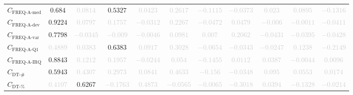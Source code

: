 \documentclass{standalone}
\newcommand{\actfreqmedianname}{\text{FREQ-A-med}}
\newcommand{\actfreqmedian}{C_{\actfreqmedianname}}
\newcommand{\actfreqdevname}{\text{FREQ-A-dev}}
\newcommand{\actfreqdev}{C_{\actfreqdevname}}
\newcommand{\actfreqvarname}{\text{FREQ-A-var}}
\newcommand{\actfreqvar}{C_{\actfreqvarname}}
\newcommand{\actfreqqonename}{\text{FREQ-A-Q1}}
\newcommand{\actfreqqone}{C_{\actfreqqonename}}
\newcommand{\actfreqiqrname}{\text{FREQ-A-IRQ}}
\newcommand{\actfreqiqr}{C_{\actfreqiqrname}}
\newcommand{\numberuniquetracesname}{\text{DT-\#}}
\newcommand{\numberuniquetraces}{C_{\numberuniquetracesname}}
\newcommand{\percentageuniquetracesname}{\text{DT-\%}}
\newcommand{\percentageuniquetraces}{C_{\percentageuniquetracesname}}
\begin{document}
\begin{tabular}{lcccccccccc}
$\actfreqmedian$ & $0.684$ & \textcolor{lightgray}{$0.0814$} & $0.5327$ & \textcolor{lightgray}{$0.0423$} & \textcolor{lightgray}{$0.2617$} & \textcolor{lightgray}{$-0.1115$} & \textcolor{lightgray}{$-0.0373$} & \textcolor{lightgray}{$0.023$} & \textcolor{lightgray}{$0.0895$} & \textcolor{lightgray}{$-0.1316$} \\ 
$\actfreqdev$ & $0.9224$ & \textcolor{lightgray}{$0.0797$} & \textcolor{lightgray}{$0.1757$} & \textcolor{lightgray}{$-0.0312$} & \textcolor{lightgray}{$0.2267$} & \textcolor{lightgray}{$-0.0472$} & \textcolor{lightgray}{$0.0479$} & \textcolor{lightgray}{$-0.006$} & \textcolor{lightgray}{$-0.0011$} & \textcolor{lightgray}{$-0.0411$} \\ 
$\actfreqvar$ & $0.7798$ & \textcolor{lightgray}{$-0.0345$} & \textcolor{lightgray}{$-0.009$} & \textcolor{lightgray}{$-0.0046$} & \textcolor{lightgray}{$0.0981$} & \textcolor{lightgray}{$0.007$} & \textcolor{lightgray}{$0.2062$} & \textcolor{lightgray}{$-0.0431$} & \textcolor{lightgray}{$-0.0395$} & \textcolor{lightgray}{$-0.0428$} \\ 
$\actfreqqone$ & \textcolor{lightgray}{$0.4889$} & \textcolor{lightgray}{$0.0383$} & $0.6383$ & \textcolor{lightgray}{$0.0917$} & \textcolor{lightgray}{$0.3028$} & \textcolor{lightgray}{$-0.0654$} & \textcolor{lightgray}{$-0.0343$} & \textcolor{lightgray}{$-0.0247$} & \textcolor{lightgray}{$0.1238$} & \textcolor{lightgray}{$-0.2149$} \\ 
$\actfreqiqr$ & $0.8843$ & \textcolor{lightgray}{$0.1212$} & \textcolor{lightgray}{$0.1957$} & \textcolor{lightgray}{$-0.0244$} & \textcolor{lightgray}{$0.054$} & \textcolor{lightgray}{$-0.1455$} & \textcolor{lightgray}{$0.0112$} & \textcolor{lightgray}{$0.0387$} & \textcolor{lightgray}{$-0.0044$} & \textcolor{lightgray}{$0.0096$} \\ 
$\numberuniquetraces$ & $0.5943$ & \textcolor{lightgray}{$0.4307$} & \textcolor{lightgray}{$0.2973$} & \textcolor{lightgray}{$0.0841$} & \textcolor{lightgray}{$0.4633$} & \textcolor{lightgray}{$-0.156$} & \textcolor{lightgray}{$-0.0348$} & \textcolor{lightgray}{$0.095$} & \textcolor{lightgray}{$0.0553$} & \textcolor{lightgray}{$0.0174$} \\ 
$\percentageuniquetraces$ & \textcolor{lightgray}{$0.4107$} & $0.6267$ & \textcolor{lightgray}{$-0.1763$} & \textcolor{lightgray}{$0.4873$} & \textcolor{lightgray}{$-0.0565$} & \textcolor{lightgray}{$-0.0065$} & \textcolor{lightgray}{$-0.3018$} & \textcolor{lightgray}{$0.0394$} & \textcolor{lightgray}{$-0.1328$} & \textcolor{lightgray}{$-0.0214$} \\ 

\end{tabular}
\end{document}
